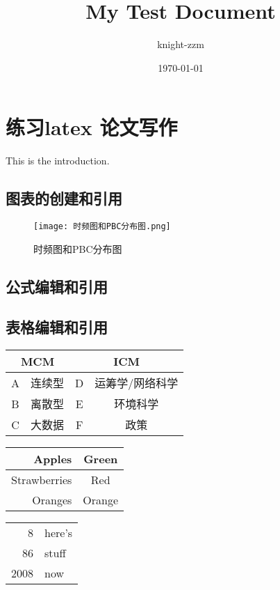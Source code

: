 \documentclass[a4paper,12pt]{article}
\begin{document}
\title{\huge My Test Document}
\author{{\large knight-zzm}}
\date{\today}
\maketitle
\thispagestyle{empty} %
\newpage

\tableofcontents
\thispagestyle{empty} %
\newpage
{}
\section{练习latex 论文写作}
This is the introduction.

\subsection{图表的创建和引用}

    \begin{figure}[h]
        \centering
        \texttt{[image: 时频图和PBC分布图.png]}
        \caption{时频图和PBC分布图}
        \label{fig:time-freq}
    \end{figure}

\subsection{公式编辑和引用}

\subsection{表格编辑和引用}
    \begin{tabular}{|c|c|c|c|}
        \hline
        \multicolumn{2}{|c|}{MCM} & \multicolumn{2}{|c|}{ICM} \\
        \hline
        A & 连续型 & D & 运筹学/网络科学\\
        \hline
        B & 离散型 & E & 环境科学\\
        \hline
        C & 大数据 & F & 政策\\
        \hline
    \end{tabular}
    
    \begin{tabular}{rc}
    Apples & Green\\
    \hline 
    Strawberries & Red \\
    \cline{1-1}
    Oranges & Orange \\
    \end{tabular}
    
    \begin{tabular}{|r|l|}
    \hline
    8 & here's \\
    \cline{2-2}
    86 & stuff\\
    \hline \hline 
    2008 & now \\
    \hline 
    \end{tabular}
\end{document}

